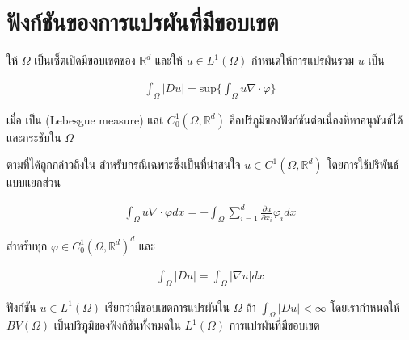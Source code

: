 \section{ฟังก์ชันของการแปรผันที่มีขอบเขต}
ให้ $\Omega$ เป็นเซ็ตเปิดมีขอบเขตของ $ \mathbb{R}^{d}$ และให้ $u \in L^{1}(\Omega)$ กำหนดให้การแปรผันรวม $u$ เป็น

\begin{align} 
    \int_{\Omega} |Du| = \text{sup} \Big\{ \int_\Omega u \nabla \cdot \varphi \Big\}
\end{align}

เมื่อ  เป็น (Lebesgue measure) แลt $C_0^1 ( \Omega , \mathbb{R}^d)$ คือปริภูมิของฟังก์ชันต่อเนื่องที่หาอนุพันธ์ได้และกระชับใน $\Omega$

\hspace{1cm} ตามที่ได้ถูกกล่าวถึงใน \cite{ref:bounded_variation} สำหรับกรณีเฉพาะซึ่งเป็นที่น่าสนใจ $u \in C^1 (\Omega, \mathbb{R}^d )$ โดยการใช้ปริพันธ์แบบแยกส่วน

\begin{align}
    \int_\Omega u \nabla \cdot \varphi d x = - \int_\Omega \sum_{i=1}^{d} \frac{\partial u}{\partial x_i} \varphi_i d x
\end{align}

สำหรับทุก $\varphi \in C_0^1 (\Omega,\mathbb{R}^{d})^{d} $ และ

\begin{align}
    \int_\Omega | D u | = \int_\Omega | \nabla u | dx
\end{align}

ฟังก์ชัน $u \in L^1 (\Omega)$ เรียกว่ามีขอบเขตการแปรผันใน $\Omega$ ถ้า $\int_\Omega |Du| < \infty$ โดยเรากำหนดให้ $BV(\Omega)$ เป็นปริภูมิของฟังก์ชันทั้งหมดใน $L^1(\Omega)$ การแปรผันที่มีขอบเขต

